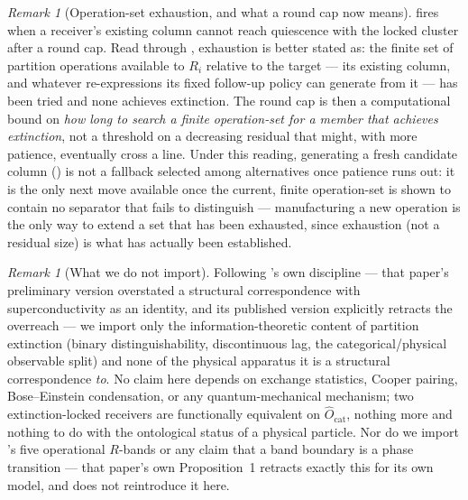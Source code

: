 \documentclass[11pt,twocolumn,a4paper]{article}
\theoremstyle{rdm}
\theoremstyle{definition}
\theoremstyle{remark}
\newtheorem{remark}[theorem]{Remark}
\newcommand{\Rec}{R}
\begin{document}
\begin{remark}[Operation-set exhaustion, and what a round cap now means]
\label{rem:operation-exhaustion}
 fires when a receiver's existing column cannot
reach quiescence with the locked cluster after a round cap. Read through
, exhaustion is better stated as:
the finite set of partition operations available to $\Rec_i$ relative to
the target — its existing column, and whatever re-expressions its fixed
follow-up policy can generate from it — has been tried and none achieves
extinction. The round cap is then a computational bound on \emph{how long
to search a finite operation-set for a member that achieves extinction},
not a threshold on a decreasing residual that might, with more patience,
eventually cross a line. Under this reading, generating a fresh candidate
column () is not a fallback selected among
alternatives once patience runs out: it is the only next move available
once the current, finite operation-set is shown to contain no separator
that fails to distinguish — manufacturing a new operation is the only way
to extend a set that has been exhausted, since exhaustion (not a residual
size) is what has actually been established.
\end{remark}

\begin{remark}[What we do not import]
\label{rem:extinction-scope}
Following \citet[\S{}1.5, Rem.~17--18]{sachikonye-coordination-regimes}'s
own discipline — that paper's preliminary version overstated a structural
correspondence with superconductivity as an identity, and its published
version explicitly retracts the overreach — we import only the
information-theoretic content of partition extinction (binary
distinguishability, discontinuous lag, the categorical/physical observable
split) and none of the physical apparatus it is a structural correspondence
\emph{to}. No claim here depends on exchange statistics, Cooper pairing,
Bose–Einstein condensation, or any quantum-mechanical mechanism; two
extinction-locked receivers are functionally equivalent on
$\hat O_{\mathrm{cat}}$, nothing more and nothing to do with the ontological
status of a physical particle. Nor do we import
\citet{sachikonye-coordination-regimes}'s five operational $R$-bands or any
claim that a band boundary is a phase transition — that paper's own
Proposition~1 retracts exactly this for its own model, and
 does not reintroduce it here.
\end{remark}
\end{document}

